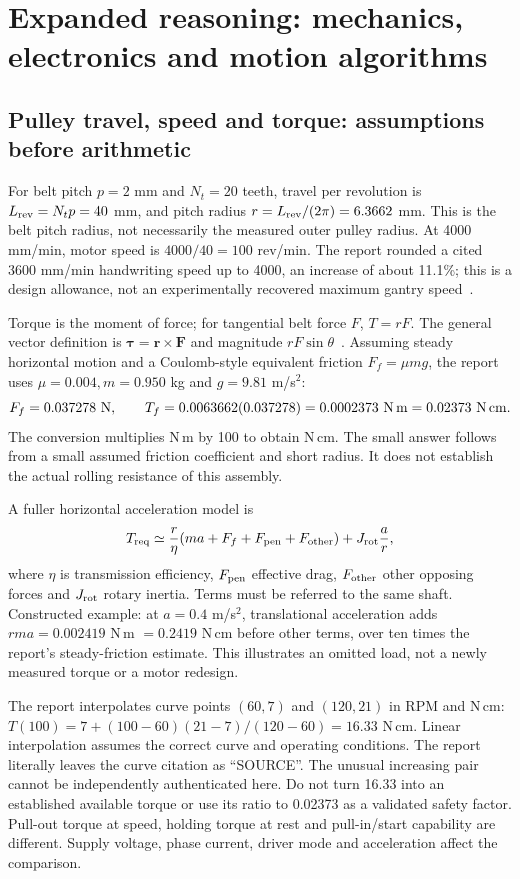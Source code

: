 \section{Expanded reasoning: mechanics, electronics and motion algorithms}
\label{sec:expand-hardware}
\subsection{Pulley travel, speed and torque: assumptions before arithmetic}
For belt pitch $p=2$ mm and $N_t=20$ teeth, travel per revolution is
$L_{\rm rev}=N_tp=40$ mm, and pitch radius
$r=L_{\rm rev}/(2\pi)=6.3662$ mm. This is the belt pitch radius, not
necessarily the measured outer pulley radius. At 4000 mm/min, motor speed
is $4000/40=100$ rev/min. The report rounded a cited 3600 mm/min handwriting
speed up to 4000, an increase of about 11.1\%; this is a design allowance,
not an experimentally recovered maximum gantry speed~\cite{finalreport2026}.

Torque is the moment of force; for tangential belt force $F$, $T=rF$.
The general vector definition is $\boldsymbol\tau=\mathbf r\times\mathbf F$
and magnitude $rF\sin\theta$~\cite{openstaxrotation}. Assuming steady
horizontal motion and a Coulomb-style equivalent friction $F_f=\mu mg$,
the report uses $\mu=0.004,m=0.950$ kg and $g=9.81$ m/s$^2$:
\[
F_f=0.037278\ {\rm N},\qquad
T_f=0.0063662(0.037278)=0.0002373\ {\rm N\,m}
       =0.02373\ {\rm N\,cm}.
\]
The conversion multiplies N\,m by 100 to obtain N\,cm. The small answer
follows from a small assumed friction coefficient and short radius. It does
not establish the actual rolling resistance of this assembly.

A fuller horizontal acceleration model is
\[
T_{\rm req}\simeq {r\over\eta}(ma+F_f+F_{\rm pen}+F_{\rm other})
              +J_{\rm rot}{a\over r},
\]
where $\eta$ is transmission efficiency, $F_{\rm pen}$ effective drag,
$F_{\rm other}$ other opposing forces and $J_{\rm rot}$ rotary inertia.
Terms must be referred to the same shaft. Constructed example: at
$a=0.4$ m/s$^2$, translational acceleration adds
$rma=0.002419$ N\,m $=0.2419$ N\,cm before other terms, over ten times
the report's steady-friction estimate. This illustrates an omitted load,
not a newly measured torque or a motor redesign.

The report interpolates curve points $(60,7)$ and $(120,21)$ in RPM and
N\,cm: $T(100)=7+(100-60)(21-7)/(120-60)=16.33$ N\,cm.
Linear interpolation assumes the correct curve and operating conditions.
The report literally leaves the curve citation as ``SOURCE''. The unusual
increasing pair cannot be independently authenticated here. Do not turn
16.33 into an established available torque or use its ratio to 0.02373 as
a validated safety factor. Pull-out torque at speed, holding torque at rest
and pull-in/start capability are different. Supply voltage, phase current,
driver mode and acceleration affect the comparison.

